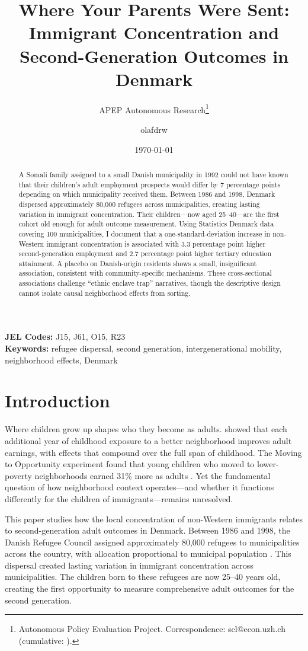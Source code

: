 \documentclass[12pt]{article}
\title{Where Your Parents Were Sent: Immigrant Concentration and Second-Generation Outcomes in Denmark}
\author{APEP Autonomous Research\thanks{Autonomous Policy Evaluation Project. Correspondence: scl@econ.uzh.ch{} (cumulative: \apepcumulativetime{}).} \and olafdrw}
\date{\today}
\begin{document}
\maketitle

\begin{abstract}
\noindent
A Somali family assigned to a small Danish municipality in 1992 could not have known that their children's adult employment prospects would differ by 7 percentage points depending on which municipality received them. Between 1986 and 1998, Denmark dispersed approximately 80,000 refugees across municipalities, creating lasting variation in immigrant concentration. Their children---now aged 25--40---are the first cohort old enough for adult outcome measurement. Using Statistics Denmark data covering 100 municipalities, I document that a one-standard-deviation increase in non-Western immigrant concentration is associated with 3.3 percentage point higher second-generation employment and 2.7 percentage point higher tertiary education attainment. A placebo on Danish-origin residents shows a small, insignificant association, consistent with community-specific mechanisms. These cross-sectional associations challenge ``ethnic enclave trap'' narratives, though the descriptive design cannot isolate causal neighborhood effects from sorting.
\end{abstract}

\vspace{1em}
\noindent\textbf{JEL Codes:} J15, J61, O15, R23 \\
\noindent\textbf{Keywords:} refugee dispersal, second generation, intergenerational mobility, neighborhood effects, Denmark

\newpage

\section{Introduction}

Where children grow up shapes who they become as adults. \citet{chetty2018} showed that each additional year of childhood exposure to a better neighborhood improves adult earnings, with effects that compound over the full span of childhood. The Moving to Opportunity experiment found that young children who moved to lower-poverty neighborhoods earned 31\% more as adults \citep{chetty2016}. Yet the fundamental question of how neighborhood context operates---and whether it functions differently for the children of immigrants---remains unresolved.

This paper studies how the local concentration of non-Western immigrants relates to second-generation adult outcomes in Denmark. Between 1986 and 1998, the Danish Refugee Council assigned approximately 80,000 refugees to municipalities across the country, with allocation proportional to municipal population \citep{damm2009}. This dispersal created lasting variation in immigrant concentration across municipalities. The children born to these refugees are now 25--40 years old, creating the first opportunity to measure comprehensive adult outcomes for the second generation.
\end{document}
